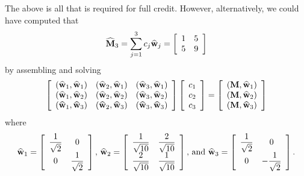 \begin{solution}
\begin{enumerate}
The above is all that is required for full credit. However, alternatively, we could have computed that
\[
\widehat{{\bf M}}_3=\sum_{j=1}^3c_j\widehat{{\bf w}}_j=\left[\begin{array}{cc}1 & 5 \\ 5 & 9\end{array}\right]
\]
by assembling and solving
\[
\left[\begin{array}{ccc} \left(\widehat{{\bf w}}_1,\widehat{{\bf w}}_1\right) & \left(\widehat{{\bf w}}_2,\widehat{{\bf w}}_1\right) & \left(\widehat{{\bf w}}_3,\widehat{{\bf w}}_1\right)
\\
\left(\widehat{{\bf w}}_1,\widehat{{\bf w}}_2\right) & \left(\widehat{{\bf w}}_2,\widehat{{\bf w}}_2\right) & \left(\widehat{{\bf w}}_3,\widehat{{\bf w}}_2\right)
\\
\left(\widehat{{\bf w}}_1,\widehat{{\bf w}}_3\right) & \left(\widehat{{\bf w}}_2,\widehat{{\bf w}}_3\right) & \left(\widehat{{\bf w}}_3,\widehat{{\bf w}}_3\right)\end{array}\right]\left[\begin{array}{c}c_1 \\ c_2 \\ c_3\end{array}\right]=\left[\begin{array}{c}\left({\bf M},\widehat{{\bf w}}_1\right) \\ \left({\bf M},\widehat{{\bf w}}_2\right) \\ \left({\bf M},\widehat{{\bf w}}_3\right)\end{array}\right]
\]
where
\[
\widehat{{\bf w}}_1=\left[\begin{array}{cc}\displaystyle{{1\over\sqrt{2}}}  & 0 \\ 0 & \displaystyle{{1\over \sqrt{2}}}\end{array}\right]\mbox{, }\widehat{{\bf w}}_2=\left[\begin{array}{cc}\displaystyle{{1\over\sqrt{10}}} & \displaystyle{{2\over\sqrt{10}}} \\ \displaystyle{{2\over\sqrt{10}}} & \displaystyle{{1\over \sqrt{10}}}\end{array}\right]\mbox{, and }\widehat{{\bf w}}_3=\left[\begin{array}{cc}\displaystyle{{1\over\sqrt{2}}} & 0 \\ 0 & \displaystyle{-{1\over\sqrt{2}}}\end{array}\right].
\]


\end{enumerate} 
\end{solution}